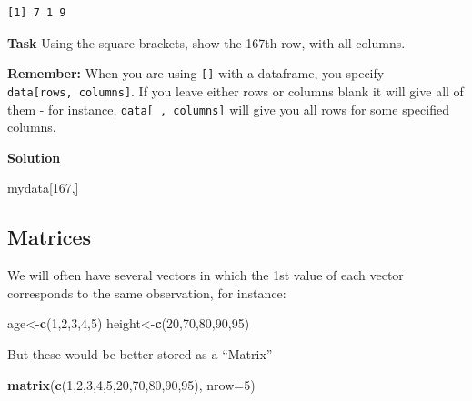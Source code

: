 \documentclass[]{book}
\newenvironment{Shaded}{\begin{snugshade}}{\end{snugshade}}
\newcommand{\DataTypeTok}[1]{\textcolor[rgb]{0.13,0.29,0.53}{#1}}
\newcommand{\DecValTok}[1]{\textcolor[rgb]{0.00,0.00,0.81}{#1}}
\newcommand{\KeywordTok}[1]{\textcolor[rgb]{0.13,0.29,0.53}{\textbf{#1}}}
\newcommand{\NormalTok}[1]{#1}
\begin{document}
\begin{verbatim}
[1] 7 1 9
\end{verbatim}

\textbf{Task}
Using the square brackets, show the 167th row, with all columns.

\textbf{Remember:} When you are using \texttt{{[}{]}} with a dataframe, you specify \texttt{data{[}rows,\ columns{]}}. If you leave either rows or columns blank it will give all of them - for instance, \texttt{data{[}\ ,\ columns{]}} will give you all rows for some specified columns.

\textbf{Solution }

\begin{Shaded}
\begin{Highlighting}[]
\NormalTok{mydata[}\DecValTok{167}\NormalTok{,]}
\end{Highlighting}
\end{Shaded}

\hypertarget{matrices}{%
\subsection*{Matrices}\label{matrices}}

We will often have several vectors in which the 1st value of each vector corresponds to the same observation, for instance:

\begin{Shaded}
\begin{Highlighting}[]
\NormalTok{age<-}\KeywordTok{c}\NormalTok{(}\DecValTok{1}\NormalTok{,}\DecValTok{2}\NormalTok{,}\DecValTok{3}\NormalTok{,}\DecValTok{4}\NormalTok{,}\DecValTok{5}\NormalTok{)}
\NormalTok{height<-}\KeywordTok{c}\NormalTok{(}\DecValTok{20}\NormalTok{,}\DecValTok{70}\NormalTok{,}\DecValTok{80}\NormalTok{,}\DecValTok{90}\NormalTok{,}\DecValTok{95}\NormalTok{)}
\end{Highlighting}
\end{Shaded}

But these would be better stored as a ``Matrix''

\begin{Shaded}
\begin{Highlighting}[]
\KeywordTok{matrix}\NormalTok{(}\KeywordTok{c}\NormalTok{(}\DecValTok{1}\NormalTok{,}\DecValTok{2}\NormalTok{,}\DecValTok{3}\NormalTok{,}\DecValTok{4}\NormalTok{,}\DecValTok{5}\NormalTok{,}\DecValTok{20}\NormalTok{,}\DecValTok{70}\NormalTok{,}\DecValTok{80}\NormalTok{,}\DecValTok{90}\NormalTok{,}\DecValTok{95}\NormalTok{), }\DataTypeTok{nrow=}\DecValTok{5}\NormalTok{)}
\end{Highlighting}
\end{Shaded}
\end{document}
